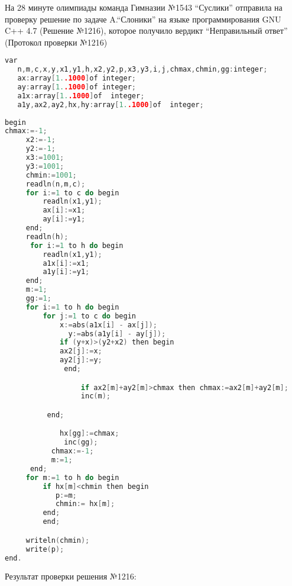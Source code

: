 На 28 минуте олимпиады команда Гимназии №1543 ``Суслики'' отправила на проверку решение по задаче A.``Слоники'' на языке программирования GNU C++ 4.7 (Решение №1216), которое получило вердикт ``Неправильный ответ'' (Протокол проверки №1216)
\begin{lstlisting}[language=c++, label=r1216, caption=Решение №1216]
var
   n,m,c,x,y,x1,y1,h,x2,y2,p,x3,y3,i,j,chmax,chmin,gg:integer;
   ax:array[1..1000]of integer;
   ay:array[1..1000]of integer;
   a1x:array[1..1000]of  integer;
   a1y,ax2,ay2,hx,hy:array[1..1000]of  integer;
   
begin
chmax:=-1;
     x2:=-1;
     y2:=-1;
     x3:=1001;
     y3:=1001;
     chmin:=1001;
     readln(n,m,c);
     for i:=1 to c do begin
         readln(x1,y1);
         ax[i]:=x1;
         ay[i]:=y1;
     end;
     readln(h);
      for i:=1 to h do begin
         readln(x1,y1);
         a1x[i]:=x1;
         a1y[i]:=y1;
     end;
     m:=1;
     gg:=1;
     for i:=1 to h do begin
         for j:=1 to c do begin
             x:=abs(a1x[i] - ax[j]);
               y:=abs(a1y[i] - ay[j]);
             if (y+x)>(y2+x2) then begin
             ax2[j]:=x;
             ay2[j]:=y;
              end;

                  if ax2[m]+ay2[m]>chmax then chmax:=ax2[m]+ay2[m];
                  inc(m);

          end;

             hx[gg]:=chmax;
              inc(gg);
           chmax:=-1;
           m:=1;
      end;
     for m:=1 to h do begin
         if hx[m]<chmin then begin
            p:=m;
            chmin:= hx[m];
         end;
         end;

     writeln(chmin);
     write(p);
end.
\end{lstlisting}


Результат проверки решения №1216:

